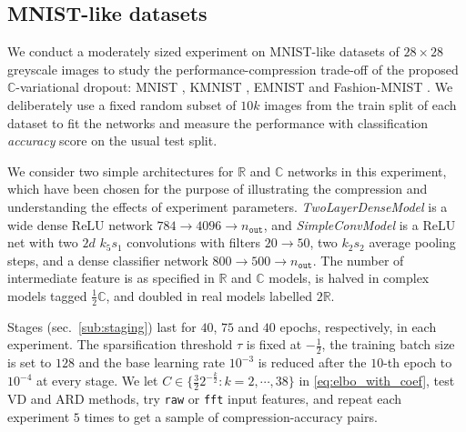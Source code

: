 \documentclass[a4paper,10pt,onecolumn]{article}
\newcommand{\real}{\mathbb{R}}
\newcommand{\cplx}{\mathbb{C}}
\begin{document}


\subsection{MNIST-like datasets} %
\label{sub:mnist_like_datasets}

We conduct a moderately sized experiment on MNIST-like datasets of $28\times 28$ greyscale
images to study the performance-compression trade-off of the proposed $\cplx$-variational
dropout: MNIST \citep{lecun_gradient-based_1998}, KMNIST \citep{clanuwat_deep_2018},
EMNIST \citep{cohen_emnist_2017} and Fashion-MNIST \citep{xiao_fashion-mnist_2017}.
%
We deliberately use a {fixed} random subset of $10k$ images from the train split of each
dataset to fit the networks and measure the performance with classification \textit{accuracy}
score on the usual test split.

We consider two simple architectures for $\real$ and $\cplx$ networks in this experiment,
which have been chosen for the purpose of illustrating the compression and understanding
the effects of experiment parameters. \textit{TwoLayerDenseModel} is a wide dense ReLU
network $784 \to 4096 \to n_\mathtt{out}$, and \textit{SimpleConvModel} is a ReLU net with
two $2d$ $k_5 s_1$ convolutions with filters $20 \to 50$, two $k_2 s_2$ average pooling steps,
and a dense classifier network $800 \to 500 \to n_\mathtt{out}$. The number of intermediate
feature is as specified in $\real$ and $\cplx$ models, is halved in complex models tagged
$\tfrac12\cplx$, and doubled in real models labelled $2\real$.

Stages (sec.~\ref{sub:staging}) last for $40$, $75$ and $40$ epochs, respectively, in each
experiment. The sparsification threshold $\tau$ is fixed at $-\tfrac12$, the training batch
size is set to $128$ and the base learning rate ${10}^{-3}$ is reduced after the $10$-th epoch
to ${10}^{-4}$ at every stage.
%
We let $
  C \in \{
    \tfrac32 2^{-\tfrac{k}2} \colon k=2, \cdots, 38
  \}
$ in \eqref{eq:elbo_with_coef}, test VD and ARD methods, try \texttt{raw} or \texttt{fft}
input features, and repeat each experiment $5$ times to get a sample of compression-accuracy
pairs.
\end{document}
